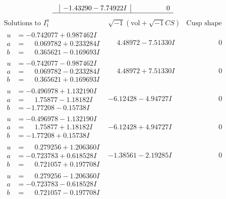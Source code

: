 \documentclass[1p]{elsarticle_modified}
\theoremstyle{definition}
\newcommand{\I}{\sqrt{-1}}
\begin{document}
$$\begin{array}{c|c|c}
 & -1.43290 - 7.74922 I & \phantom{-0.000000 } 0\\
 \hline 
 \end{array}$$\newpage$$\begin{array}{c|c|c}  
\text{Solutions to }I^u_{1}& \I (\text{vol} + \sqrt{-1}CS) & \text{Cusp shape}\\
 \hline 
\begin{aligned}
u &= -0.742077 + 0.987462 I \\
a &= \phantom{-}0.069782 + 0.233284 I \\
b &= \phantom{-}0.365621 - 0.169693 I\end{aligned}
 & \phantom{-}4.48972 - 7.51330 I & \phantom{-0.000000 } 0 \\ \hline\begin{aligned}
u &= -0.742077 - 0.987462 I \\
a &= \phantom{-}0.069782 - 0.233284 I \\
b &= \phantom{-}0.365621 + 0.169693 I\end{aligned}
 & \phantom{-}4.48972 + 7.51330 I & \phantom{-0.000000 } 0 \\ \hline\begin{aligned}
u &= -0.496978 + 1.132190 I \\
a &= \phantom{-}1.75877 - 1.18182 I \\
b &= -1.77208 - 0.15738 I\end{aligned}
 & -6.12428 - 4.94727 I & \phantom{-0.000000 } 0 \\ \hline\begin{aligned}
u &= -0.496978 - 1.132190 I \\
a &= \phantom{-}1.75877 + 1.18182 I \\
b &= -1.77208 + 0.15738 I\end{aligned}
 & -6.12428 + 4.94727 I & \phantom{-0.000000 } 0 \\ \hline\begin{aligned}
u &= \phantom{-}0.279256 + 1.206360 I \\
a &= -0.723783 + 0.618528 I \\
b &= \phantom{-}0.721057 + 0.197708 I\end{aligned}
 & -1.38561 - 2.19285 I & \phantom{-0.000000 } 0 \\ \hline\begin{aligned}
u &= \phantom{-}0.279256 - 1.206360 I \\
a &= -0.723783 - 0.618528 I \\
b &= \phantom{-}0.721057 - 0.197708 I\end{aligned}

\end{array}$$
\end{document}
